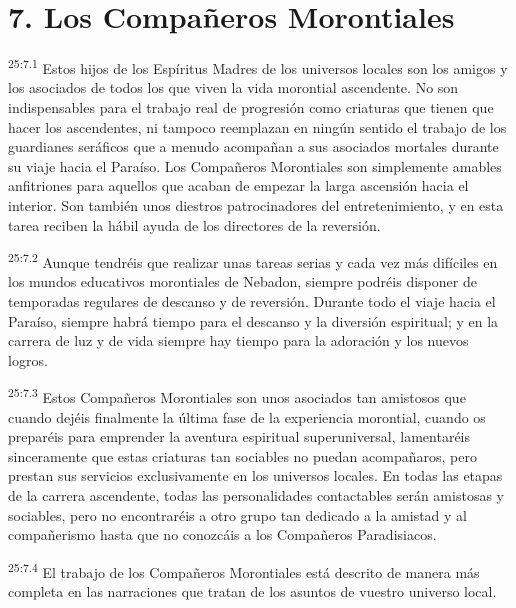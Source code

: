 \section*{7. Los Compañeros Morontiales}
\par
\textsuperscript{25:7.1} Estos hijos de los Espíritus Madres de los universos locales son los amigos y los asociados de todos los que viven la vida morontial ascendente. No son indispensables para el trabajo real de progresión como criaturas que tienen que hacer los ascendentes, ni tampoco reemplazan en ningún sentido el trabajo de los guardianes seráficos que a menudo acompañan a sus asociados mortales durante su viaje hacia el Paraíso. Los Compañeros Morontiales son simplemente amables anfitriones para aquellos que acaban de empezar la larga ascensión hacia el interior. Son también unos diestros patrocinadores del entretenimiento, y en esta tarea reciben la hábil ayuda de los directores de la reversión.

\par
\textsuperscript{25:7.2} Aunque tendréis que realizar unas tareas serias y cada vez más difíciles en los mundos educativos morontiales de Nebadon, siempre podréis disponer de temporadas regulares de descanso y de reversión. Durante todo el viaje hacia el Paraíso, siempre habrá tiempo para el descanso y la diversión espiritual; y en la carrera de luz y de vida siempre hay tiempo para la adoración y los nuevos logros.

\par
\textsuperscript{25:7.3} Estos Compañeros Morontiales son unos asociados tan amistosos que cuando dejéis finalmente la última fase de la experiencia morontial, cuando os preparéis para emprender la aventura espiritual superuniversal, lamentaréis sinceramente que estas criaturas tan sociables no puedan acompañaros, pero prestan sus servicios exclusivamente en los universos locales. En todas las etapas de la carrera ascendente, todas las personalidades contactables serán amistosas y sociables, pero no encontraréis a otro grupo tan dedicado a la amistad y al compañerismo hasta que no conozcáis a los Compañeros Paradisiacos.

\par
\textsuperscript{25:7.4} El trabajo de los Compañeros Morontiales está descrito de manera más completa en las narraciones que tratan de los asuntos de vuestro universo local.

